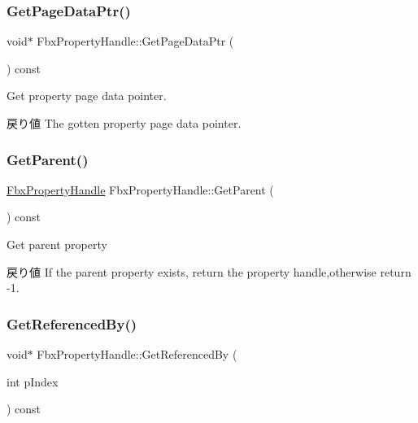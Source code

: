 \subsubsection{\texorpdfstring{Get\+Page\+Data\+Ptr()}{GetPageDataPtr()}}
{\footnotesize\ttfamily void$\ast$ Fbx\+Property\+Handle\+::\+Get\+Page\+Data\+Ptr (\begin{DoxyParamCaption}{ }\end{DoxyParamCaption}) const}

Get property page data pointer. \begin{DoxyReturn}{戻り値}
The gotten property page data pointer. 
\end{DoxyReturn}
\mbox{\label{class_fbx_property_handle_a10599909c3fc0a5bdfba5b7dc05f8ec6}} 
\subsubsection{\texorpdfstring{Get\+Parent()}{GetParent()}}
{\footnotesize\ttfamily \hyperlink{class_fbx_property_handle}{Fbx\+Property\+Handle} Fbx\+Property\+Handle\+::\+Get\+Parent (\begin{DoxyParamCaption}{ }\end{DoxyParamCaption}) const}

Get parent property \begin{DoxyReturn}{戻り値}
If the parent property exists, return the property handle,otherwise return -\/1. 
\end{DoxyReturn}
\mbox{\label{class_fbx_property_handle_a94151c3aa9e0b6f1881bbec6ca389d0a}} 
\subsubsection{\texorpdfstring{Get\+Referenced\+By()}{GetReferencedBy()}}
{\footnotesize\ttfamily void$\ast$ Fbx\+Property\+Handle\+::\+Get\+Referenced\+By (\begin{DoxyParamCaption}\item[{int}]{p\+Index }\end{DoxyParamCaption}) const}

